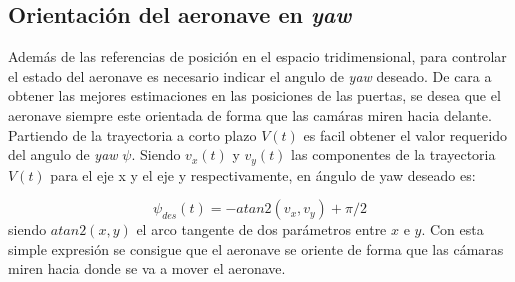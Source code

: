 \subsection{Orientación del aeronave en \textit{yaw}}
Además de las referencias de posición en el espacio tridimensional, para controlar el estado del aeronave es necesario indicar el angulo de \textit{yaw} deseado. De cara a obtener las mejores estimaciones en las posiciones de las puertas, se desea que el aeronave siempre este orientada de forma que las camáras miren hacia delante. Partiendo de la trayectoria a corto plazo $V(t)$ es facil obtener el valor requerido del angulo de \textit{yaw} $\psi$. Siendo $v_x(t)$ y $v_y(t)$ las componentes de la trayectoria $V(t)$ para el eje x y el eje y respectivamente, en ángulo de yaw deseado es:

\begin{equation}
	\psi_{des}(t) = -atan2(v_x,v_y) + \pi/2
\end{equation}
siendo $atan2(x,y)$ el arco tangente de dos parámetros entre $x$ e $y$. Con esta simple expresión se consigue que el aeronave se oriente de forma que las cámaras miren hacia donde se va a mover el aeronave.


















